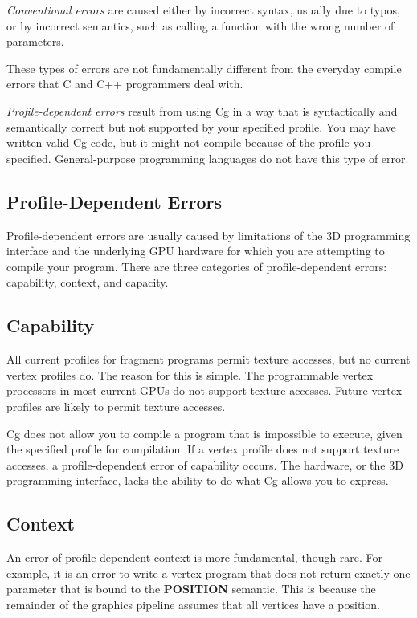 \documentclass{book}
\begin{document}
\textit{Conventional errors} are caused either by incorrect syntax, usually due to typos, or by incorrect semantics, such as calling a function with the wrong number of parameters.

These types of errors are not fundamentally different from the everyday compile errors that C and C++ programmers deal with.

\textit{Profile-dependent errors} result from using Cg in a way that is syntactically and semantically correct but not supported by your specified profile. You may have written valid Cg code, but it might not compile because of the profile you specified. General-purpose programming languages do not have this type of error.

\subsection{Profile-Dependent Errors}

Profile-dependent errors are usually caused by limitations of the 3D programming interface and the underlying GPU hardware for which you are attempting to compile your program. There are three categories of profile-dependent errors: capability, context, and capacity.

\subsection*{Capability}

All current profiles for fragment programs permit texture accesses, but no current vertex profiles do. The reason for this is simple. The programmable vertex processors in most current GPUs do not support texture accesses. Future vertex profiles are likely to permit texture accesses.

Cg does not allow you to compile a program that is impossible to execute, given the specified profile for compilation. If a vertex profile does not support texture accesses, a profile-dependent error of capability occurs. The hardware, or the 3D programming interface, lacks the ability to do what Cg allows you to express.

\subsection*{Context}

An error of profile-dependent context is more fundamental, though rare. For example, it is an error to write a vertex program that does not return exactly one parameter that is bound to the \textbf{POSITION} semantic. This is because the remainder of the graphics pipeline assumes that all vertices have a position.
\end{document}
